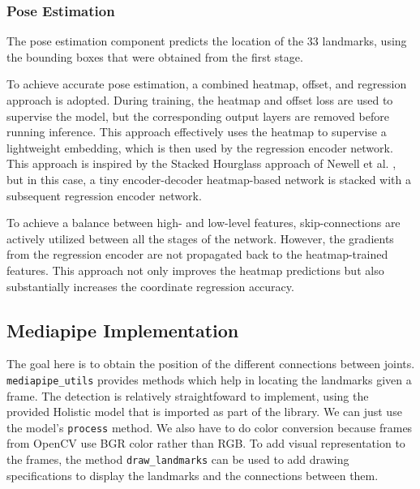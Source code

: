 \documentclass[final,rdr32.tex]{subfiles}
\begin{document}
\subsubsection{Pose Estimation}

The pose estimation component predicts the location of the 33 landmarks, using the bounding boxes that were obtained from the first stage.

To achieve accurate pose estimation, a combined heatmap, offset, and regression approach is adopted. During training, the heatmap and offset loss are used to supervise the model, but the corresponding output layers are removed before running inference. This approach effectively uses the heatmap to supervise a lightweight embedding, which is then used by the regression encoder network. This approach is inspired by the Stacked Hourglass approach of Newell et al. \cite{newell2016stacked}, but in this case, a tiny encoder-decoder heatmap-based network is stacked with a subsequent regression encoder network.

To achieve a balance between high- and low-level features, skip-connections are actively utilized between all the stages of the network. However, the gradients from the regression encoder are not propagated back to the heatmap-trained features. This approach not only improves the heatmap predictions but also substantially increases the coordinate regression accuracy.

\subsection{Mediapipe Implementation}

The goal here is to obtain the position of the different connections between joints.
\newline \verb|mediapipe_utils| provides methods which help in locating the landmarks given a frame. The detection is relatively straightfoward to implement, using the provided Holistic model that is imported as part of the library. We can just use the model's \verb|process| method. We also have to do color conversion because frames from OpenCV use BGR color rather than RGB. To add visual representation to the frames, the method \verb|draw_landmarks| can be used to add drawing specifications to display the landmarks and the connections between them.
\end{document}
